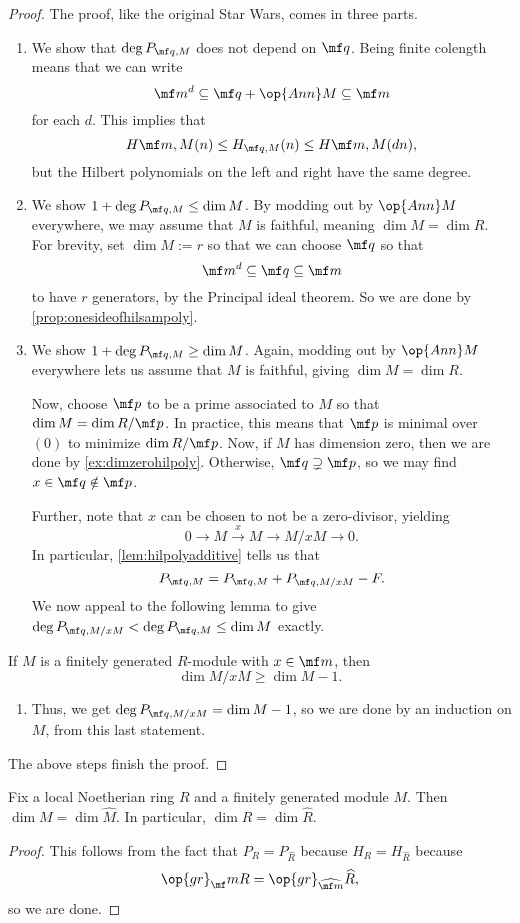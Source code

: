 \documentclass[../notes.tex]{subfiles}
\begin{document}
\begin{proof}
	The proof, like the original Star Wars, comes in three parts.
	\begin{enumerate}
		\item We show that $\deg P_{\mf q,M}$ does not depend on $\mf q$. Being finite colength means that we can write
		\[\mf m^d\subseteq\mf q+\op{Ann}M\subseteq\mf m\]
		for each $d$. This implies that
		\[H{\mf m,M}(n)\le H_{\mf q,M}(n)\le H{\mf m,M}(dn),\]
		but the Hilbert polynomials on the left and right have the same degree.
		\item We show $1+\deg P_{\mf q,M}\le\dim M$. By modding out by $\op{Ann}M$ everywhere, we may assume that $M$ is faithful, meaning $\dim M=\dim R$. For brevity, set $\dim M:=r$ so that we can choose $\mf q$ so that
		\[\mf m^d\subseteq\mf q\subseteq\mf m\]
		to have $r$ generators, by the Principal ideal theorem. So we are done by \autoref{prop:onesideofhilsampoly}.
		\item We show $1+\deg P_{\mf q,M}\ge\dim M$. Again, modding out by $\op{Ann}M$ everywhere lets us assume that $M$ is faithful, giving $\dim M=\dim R$.

		Now, choose $\mf p$ to be a prime associated to $M$ so that $\dim M=\dim R/\mf p$. In practice, this means that $\mf p$ is minimal over $(0)$ to minimize $\dim R/\mf p$. Now, if $M$ has dimension zero, then we are done by \autoref{ex:dimzerohilpoly}. Otherwise, $\mf q\supsetneq\mf p$, so we may find $x\in\mf q\notin\mf p$.

		Further, note that $x$ can be chosen to not be a zero-divisor, yielding
		\[0\to M\stackrel x\to M\to M/xM\to0.\]
		In particular, \autoref{lem:hilpolyadditive} tells us that
		\[P_{\mf q,M}=P_{\mf q,M}+P_{\mf q,M/xM}-F.\]
		We now appeal to the following lemma to give $\deg P_{\mf q,M/xM}<\deg P_{\mf q,M}\le\dim M$ exactly.
	\end{enumerate}
	\begin{lemma}
		If $M$ is a finitely generated $R$-module with $x\in\mf m$, then
		\[\dim M/xM\ge\dim M-1.\]
	\end{lemma}
	\begin{enumerate}
		\item[] Thus, we get $\deg P_{\mf q,M/xM}=\dim M-1$, so we are done by an induction on $M$, from this last statement.
	\end{enumerate}
	The above steps finish the proof.
\end{proof}
\begin{corollary}
	Fix a local Noetherian ring $R$ and a finitely generated module $M$. Then $\dim M=\dim\widehat M$. In particular, $\dim R=\dim\widehat R$.
\end{corollary}
\begin{proof}
	This follows from the fact that $P_R=P_{\widehat R}$ because $H_R=H_{\widehat R}$ because
	\[\op{gr}_\mf mR=\op{gr}_{\widehat{\mf m}}\widehat R,\]
	so we are done.
\end{proof}
\end{document}
